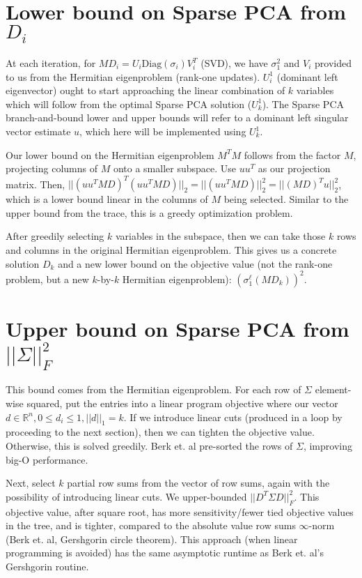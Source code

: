 \documentclass{article}
\begin{document}
\section{Lower bound on Sparse PCA from $D_i$}

At each iteration, for $MD_i = U_i \text{Diag}(\sigma_i) V_i^T$ (SVD), we have $\sigma_1^2$ and $V_i$ provided to us from the Hermitian eigenproblem (rank-one updates). $U_i^1$ (dominant left eigenvector) ought to start approaching the linear combination of $k$ variables which will follow from the optimal Sparse PCA solution ($U_k^1$). The Sparse PCA branch-and-bound lower and upper bounds will refer to a dominant left singular vector estimate $u$, which here will be implemented using $U_k^1$.

Our lower bound on the Hermitian eigenproblem $M^T M$ follows from the factor $M$, projecting columns of $M$ onto a smaller subspace. Use $uu^T$ as our projection matrix. Then, $||(uu^T MD)^T (uu^T MD)||_2 = ||(uu^T MD)||_2^2 = ||(MD)^T u||_2^2$, which is a lower bound linear in the columns of $M$ being selected. Similar to the upper bound from the trace, this is a greedy optimization problem.

After greedily selecting $k$ variables in the subspace, then we can take those $k$ rows and columns in the original Hermitian eigenproblem. This gives us a concrete solution $D_k$ and a new lower bound on the objective value (not the rank-one problem, but a new $k$-by-$k$ Hermitian eigenproblem): $(\sigma_1^\ell(MD_k))^2$.

\section{Upper bound on Sparse PCA from $||\Sigma||_F^2$}

This bound comes from the Hermitian eigenproblem. For each row of $\Sigma$ element-wise squared, put the entries into a linear program objective where our vector $d \in \mathbb{R}^n, 0\le d_i \le 1, ||d||_1 = k$. If we introduce linear cuts (produced in a loop by proceeding to the next section), then we can tighten the objective value. Otherwise, this is solved greedily. Berk et. al pre-sorted the rows of $\Sigma$, improving big-O performance.

Next, select $k$ partial row sums from the vector of row sums, again with the possibility of introducing linear cuts. We upper-bounded $||D^T \Sigma D||_F^2$. This objective value, after square root, has more sensitivity/fewer tied objective values in the tree, and is tighter, compared to the absolute value row sums $\infty$-norm (Berk et. al, Gershgorin circle theorem). This approach (when linear programming is avoided) has the same asymptotic runtime as Berk et. al's Gershgorin routine.
\end{document}
